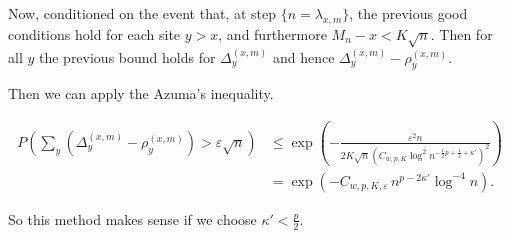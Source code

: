 Now, conditioned on the event that, at step $\{n = \lambda_{x, m}\}  $, the previous good conditions hold for each site  $y > x$, and furthermore $M_n - x < K \sqrt{n} $. Then for all $y$ the previous bound holds for $\Delta_y^{(x,m)}$ and hence $\Delta_y^{(x,m)} - \rho_y^{(x,m)}$.

Then we can apply the Azuma's inequality.

\begin{align*}
	P\left( \sum_y (\Delta_y^{(x,m)} - \rho_y^{(x,m)}) > \varepsilon \sqrt{n}  \right) 
	&\le \exp\left( - \frac{\varepsilon^2 n}{2 K \sqrt{n} \left( C_{w, p, K} \log^2 n^{-\frac{1}{2}p + \frac{1}{4} + \kappa'} \right)^2 } \right) \\
	&= \exp\left( - C_{w, p, K, \varepsilon} \, n^{p - 2 \kappa'} \log^{-4} n \right) 
.\end{align*}

So this method makes sense if we choose $\kappa' < \frac{p}{2}$.
